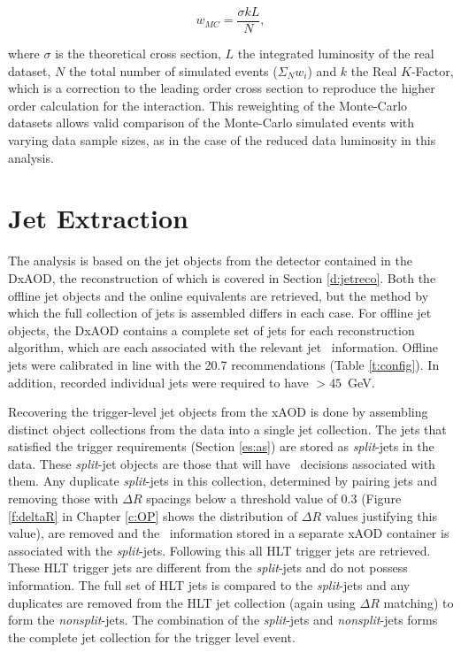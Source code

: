 		 \begin{equation}
		 w_{MC} = \frac{\sigma k L}{N},
		 \end{equation}

		 where $\sigma$ is the theoretical cross section, $L$ the integrated luminosity of the real dataset, $N$ the total number of simulated events ($\Sigma_N w_i$) and $k$ the Real $K$-Factor, which is a correction to the leading order cross section to reproduce the higher order calculation for the interaction. This reweighting of the Monte-Carlo datasets allows valid comparison of the Monte-Carlo simulated events with varying data sample sizes, as in the case of the reduced data luminosity in this analysis.


	\section{Jet Extraction}
	\label{es:jetextract}

		The analysis is based on the jet objects from the detector contained in the DxAOD, the reconstruction of which is covered in Section \ref{d:jetreco}. Both the offline jet objects and the online equivalents are retrieved, but the method by which the full collection of jets is assembled differs in each case. For offline jet objects, the DxAOD contains a complete set of jets for each reconstruction algorithm, which are each associated with the relevant jet \btag\, information. Offline jets were calibrated in line with the 20.7 recommendations (Table \ref{t:config}). In addition, recorded individual jets were required to have \pt$>45$~GeV.

		Recovering the trigger-level jet objects from the xAOD is done by assembling distinct object collections from the data into a single jet collection. The jets that satisfied the trigger requirements (Section \ref{es:as}) are stored as \textit{split}-jets in the data. These \textit{split}-jet objects are those that will have \btag\ decisions associated with them. Any duplicate \textit{split}-jets in this collection, determined by pairing jets and removing those with $\Delta R$ spacings below a threshold value of 0.3 (Figure \ref{f:deltaR} in Chapter \ref{c:OP} shows the distribution of $\Delta R$ values justifying this value), are removed and the \btag\, information stored in a separate xAOD container is associated with the \textit{split}-jets. Following this all HLT trigger jets are retrieved. These HLT trigger jets are different from the \textit{split}-jets and do not possess \btag\, information. The full set of HLT jets is compared to the \textit{split}-jets and any duplicates are removed from the HLT jet collection (again using $\Delta R$ matching) to form the \textit{nonsplit}-jets. The combination of the \textit{split}-jets and \textit{nonsplit}-jets forms the complete jet collection for the trigger level event.

